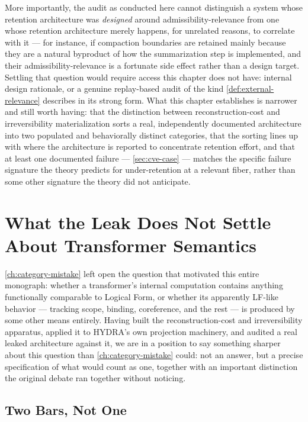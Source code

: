 \documentclass[11pt]{book}
\theoremstyle{plain}
\theoremstyle{definition}
\theoremstyle{remark}
\begin{document}
More importantly, the audit as conducted here cannot distinguish a
system whose retention architecture was \emph{designed} around
admissibility-relevance from one whose retention architecture merely
happens, for unrelated reasons, to correlate with it --- for instance,
if compaction boundaries are retained mainly because they are a
natural byproduct of how the summarization step is implemented, and
their admissibility-relevance is a fortunate side effect rather than a
design target. Settling that question would require access this
chapter does not have: internal design rationale, or a genuine
replay-based audit of the kind \cref{def:external-relevance} describes
in its strong form. What this chapter establishes is narrower and
still worth having: that the distinction between reconstruction-cost
and irreversibility materialization sorts a real, independently
documented architecture into two populated and behaviorally distinct
categories, that the sorting lines up with where the architecture is
reported to concentrate retention effort, and that at least one
documented failure --- \cref{sec:cve-case} --- matches the specific
failure signature the theory predicts for under-retention at a
relevant fiber, rather than some other signature the theory did not
anticipate.
\chapter{What the Leak Does Not Settle About Transformer Semantics}
\label{ch:transformer-semantics}

\cref{ch:category-mistake} left open the question that motivated this
entire monograph: whether a transformer's internal computation contains
anything functionally comparable to Logical Form, or whether its
apparently LF-like behavior --- tracking scope, binding, coreference,
and the rest --- is produced by some other means entirely. Having built
the reconstruction-cost and irreversibility apparatus, applied it to
HYDRA's own projection machinery, and audited a real leaked architecture
against it, we are in a position to say something sharper about this
question than \cref{ch:category-mistake} could: not an answer, but a
precise specification of what would count as one, together with an
important distinction the original debate ran together without
noticing.

\section{Two Bars, Not One}
\label{sec:two-bars}
\end{document}
